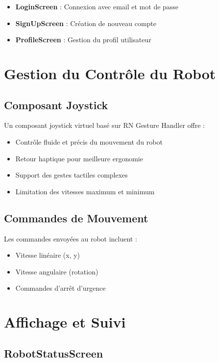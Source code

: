 \documentclass[12pt,a4paper,oneside]{report}
\begin{document}
\begin{itemize}
  \item \textbf{LoginScreen} : Connexion avec email et mot de passe
  \item \textbf{SignUpScreen} : Création de nouveau compte
  \item \textbf{ProfileScreen} : Gestion du profil utilisateur
\end{itemize}

\section{Gestion du Contrôle du Robot}

\subsection{Composant Joystick}

Un composant joystick virtuel basé sur RN Gesture Handler offre :

\begin{itemize}
  \item Contrôle fluide et précis du mouvement du robot
  \item Retour haptique pour meilleure ergonomie
  \item Support des gestes tactiles complexes
  \item Limitation des vitesses maximum et minimum
\end{itemize}

\subsection{Commandes de Mouvement}

Les commandes envoyées au robot incluent :

\begin{itemize}
  \item Vitesse linéaire (x, y)
  \item Vitesse angulaire (rotation)
  \item Commandes d'arrêt d'urgence
\end{itemize}

\section{Affichage et Suivi}

\subsection{RobotStatusScreen}
\end{document}
